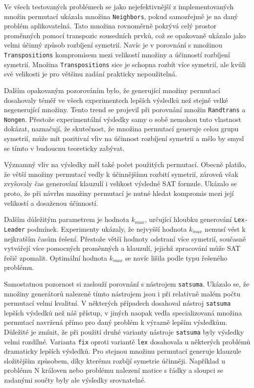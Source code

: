 Ve všech testovaných problémech se jako nejefektivnější z implementovaných množin permutací ukázala množina \texttt{Neighbors}, pokud samozřejmě je na daný problém aplikovatelná. Tato množina rovnoměrně pokrývá celý prostor proměnných pomocí transpozic sousedních prvků, což se opakovaně ukázalo jako velmi účinný způsob rozbíjení symetrií. Navíc je v porovnání s množinou \texttt{Transpositions} kompromisem mezi velikostí množiny a účinností rozbíjení symetrií. Množina \texttt{Transpositions} sice je schopna rozbít více symetrií, ale kvůli své velikosti je pro většinu zadání prakticky nepoužitelná.

Dalším opakovaným pozorováním bylo, že generující množiny permutací dosahovaly téměř ve všech experimentech lepších výsledků než stejně velké negenerující množiny. Tento trend se projevil při porovnání množin \texttt{Randtrans} a \texttt{Nongen}. Přestože experimentální výsledky samy o sobě nemohou tuto vlastnost dokázat, naznačují, že skutečnost, že množina permutací generuje celou grupu symetrií, může mít pozitivní vliv na účinnost rozbíjení symetrií a mělo by smysl se tímto v budoucnu teoreticky zabývat.

Významný vliv na výsledky měl také počet použitých permutací. Obecně platilo, že větší množiny permutací vedly k účinnějšímu rozbití symetrií, zároveň však zvyšovaly čas generování klauzulí i velikost výsledné SAT formule. Ukázalo se proto, že při návrhu množiny permutací je nutné hledat kompromis mezi její velikostí a dosaženou účinností.

Dalším důležitým parametrem je hodnota $k_{max}$, určující hloubku generování \texttt{Lex-Leader} podmínek. Experimenty ukázaly, že nejvyšší hodnota $k_{max}$ nemusí vést k nejkratším časům řešení. Přestože větší hodnoty odstraní více symetrií, současně vytvářejí více pomocných proměnných a klauzulí, jejichž zpracování může SAT řešič zpomalit. Optimální hodnota $k_{max}$ se navíc lišila podle typu řešeného problému.

Samostatnou pozornost si zaslouží porovnání s nástrojem \texttt{satsuma}. Ukázalo se, že množiny generátorů nalezené tímto nástrojem jsou i při relativně malém počtu permutací velmi kvalitní. V některých případech dosahoval nástroj \texttt{satsuma} lepších výsledků než náš přístup, v jiných naopak vedla specializovaná množina permutací navržená přímo pro daný problém k výrazně lepším výsledkům. Důležité je zmínit, že při použití druhé varianty nástroje \texttt{satsuma} byly výsledky velmi rozdílné. Varianta \texttt{fix} oproti variantě \texttt{lex} dosahovala u některých problémů dramaticky lepších výsledků. Pro stejnou množinu permutací generuje klauzule složitějším způsobem, díky kterému rozbíjí symetrie účinněji. Například u problému N královen nebo problému nalezení matice s řádky a sloupci se zadanými součty byly ale výsledky srovnatelné.

